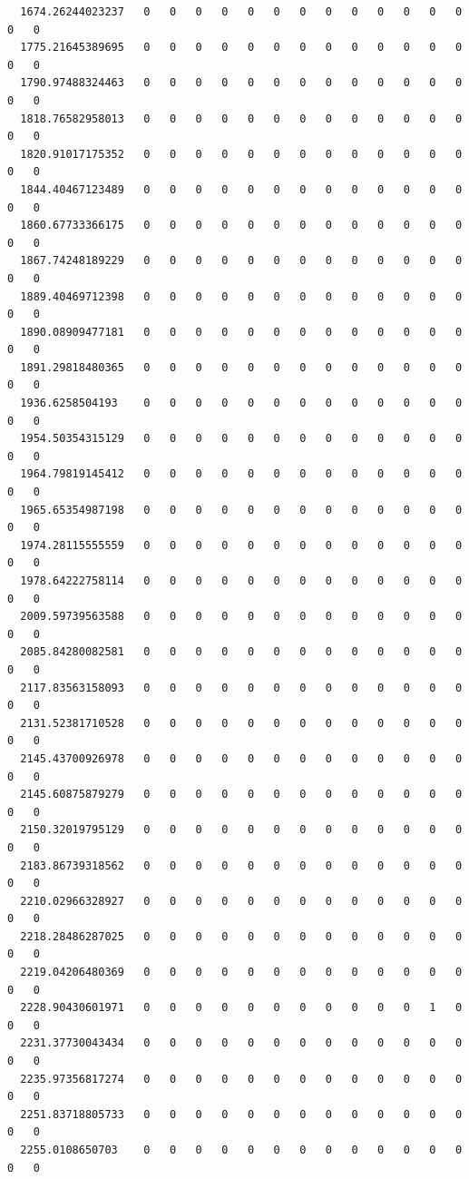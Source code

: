 \documentclass[
  letterpaper,
  DIV=11,
  numbers=noendperiod]{scrartcl}
\begin{document}
\begin{verbatim}
  1674.26244023237   0   0   0   0   0   0   0   0   0   0   0   0   0   0   0
  1775.21645389695   0   0   0   0   0   0   0   0   0   0   0   0   0   0   0
  1790.97488324463   0   0   0   0   0   0   0   0   0   0   0   0   0   0   0
  1818.76582958013   0   0   0   0   0   0   0   0   0   0   0   0   0   0   0
  1820.91017175352   0   0   0   0   0   0   0   0   0   0   0   0   0   0   0
  1844.40467123489   0   0   0   0   0   0   0   0   0   0   0   0   0   0   0
  1860.67733366175   0   0   0   0   0   0   0   0   0   0   0   0   0   0   0
  1867.74248189229   0   0   0   0   0   0   0   0   0   0   0   0   0   0   0
  1889.40469712398   0   0   0   0   0   0   0   0   0   0   0   0   0   0   0
  1890.08909477181   0   0   0   0   0   0   0   0   0   0   0   0   0   0   0
  1891.29818480365   0   0   0   0   0   0   0   0   0   0   0   0   0   0   0
  1936.6258504193    0   0   0   0   0   0   0   0   0   0   0   0   0   0   0
  1954.50354315129   0   0   0   0   0   0   0   0   0   0   0   0   0   0   0
  1964.79819145412   0   0   0   0   0   0   0   0   0   0   0   0   0   0   0
  1965.65354987198   0   0   0   0   0   0   0   0   0   0   0   0   0   0   0
  1974.28115555559   0   0   0   0   0   0   0   0   0   0   0   0   0   0   0
  1978.64222758114   0   0   0   0   0   0   0   0   0   0   0   0   0   0   0
  2009.59739563588   0   0   0   0   0   0   0   0   0   0   0   0   0   0   0
  2085.84280082581   0   0   0   0   0   0   0   0   0   0   0   0   0   0   0
  2117.83563158093   0   0   0   0   0   0   0   0   0   0   0   0   0   0   0
  2131.52381710528   0   0   0   0   0   0   0   0   0   0   0   0   0   0   0
  2145.43700926978   0   0   0   0   0   0   0   0   0   0   0   0   0   0   0
  2145.60875879279   0   0   0   0   0   0   0   0   0   0   0   0   0   0   0
  2150.32019795129   0   0   0   0   0   0   0   0   0   0   0   0   0   0   0
  2183.86739318562   0   0   0   0   0   0   0   0   0   0   0   0   0   0   0
  2210.02966328927   0   0   0   0   0   0   0   0   0   0   0   0   0   0   0
  2218.28486287025   0   0   0   0   0   0   0   0   0   0   0   0   0   0   0
  2219.04206480369   0   0   0   0   0   0   0   0   0   0   0   0   0   0   0
  2228.90430601971   0   0   0   0   0   0   0   0   0   0   0   1   0   0   0
  2231.37730043434   0   0   0   0   0   0   0   0   0   0   0   0   0   0   0
  2235.97356817274   0   0   0   0   0   0   0   0   0   0   0   0   0   0   0
  2251.83718805733   0   0   0   0   0   0   0   0   0   0   0   0   0   0   0
  2255.0108650703    0   0   0   0   0   0   0   0   0   0   0   0   0   0   0

\end{verbatim}
\end{document}
